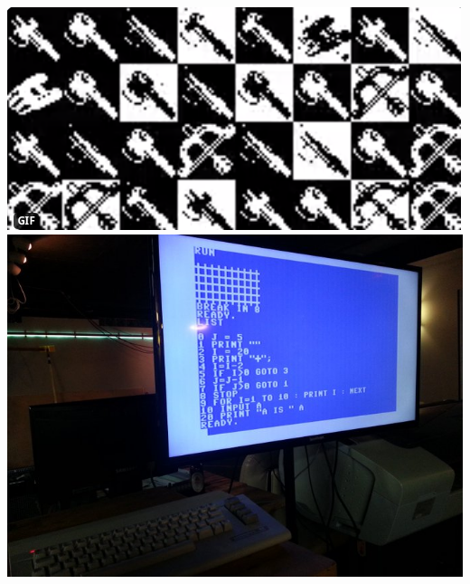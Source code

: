 \documentclass[../r.tex]{subfiles}
\begin{document}
\noindent
\href{https://twitter.com/randompast/status/722769934485483520}{\includegraphics[scale=0.4]{../fun/iconz.png}}
\href{https://twitter.com/randompast/status/885144483385536512}{\includegraphics[scale=0.2]{../fun/c64.jpeg}}
\end{document}
